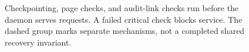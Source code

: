 \begin{figure}[H]
\centering
{}
\caption{Checkpointing, page checks, and audit-link checks run before the daemon serves requests. A failed critical check blocks service. The dashed group marks separate mechanisms, not a completed shared recovery invariant.}
\label{fig:swk-recovery-pipeline}
\end{figure}
